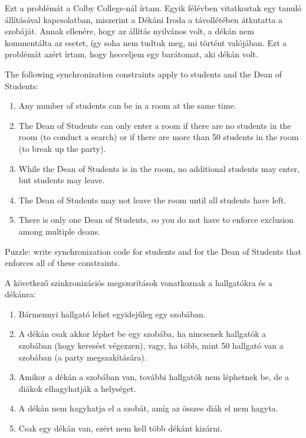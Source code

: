 \documentclass{book}
\begin{document}
Ezt a problémát a Colby College-nál írtam. Egyik félévben vitatkoztak egy tanuló állításával
kapcsolatban, miszerint a Dékáni Iroda a távollétében átkutatta a szobáját. Annak ellenére,
hogy az állítás nyilvános volt, a dékán nem kommentálta az esetet, így soha nem tudtuk meg,
mi történt valójában. Ezt a problémát azért írtam, hogy hecceljem egy barátomat, aki dékán
volt.

The following synchronization constraints apply to students
and the Dean of Students:

\begin{enumerate}

\item Any number of students can be in a room at the same
time.

\item The Dean of Students can only enter a room if there
are no students in the room (to conduct a search) or if
there are more than 50 students in the room (to break up
the party).

\item While the Dean of Students is in the room, no additional
students may enter, but students may leave.

\item The Dean of Students may not leave the room until all
students have left.

\item There is only one Dean of Students, so you do not have
to enforce exclusion among multiple deans.

\end{enumerate}

Puzzle: write synchronization code for students and for the
Dean of Students that enforces all of these constraints.

A következő szinkronizációs megszorítások vonatkoznak a hallgatókra és a dékánra:

\begin{enumerate}

\item Bármennyi hallgató lehet egyidejűleg egy szobában.
\item A dékán csak akkor léphet be egy szobába, ha nincsenek hallgatók a szobában (hogy
keresést végezzen), vagy, ha több, mint 50 hallgató van a szobában (a party
megszakítására).
\item Amikor a dékán a szobában van, további hallgatók nem léphetnek be, de a diákok
elhagyhatják a helységet.
\item A dékán nem hagyhatja el a szobát, amíg az összes diák el nem hagyta.
\item Csak egy dékán van, ezért nem kell több dékánt kizárni.

\end{enumerate}
\end{document}
